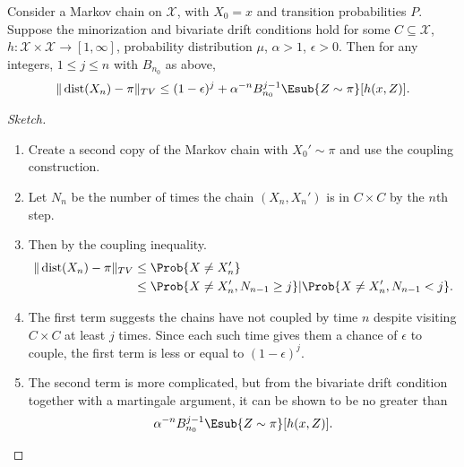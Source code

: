 \documentclass[12pt]{article}
\begin{document}
\begin{theorem}
    Consider a Markov chain on \( \mathcal{X} \), with \( X_0 = x \) and
    transition probabilities \( P \).  Suppose the minorization and
    bivariate drift conditions hold for some \( C \subseteq \mathcal{X} \),
    \( h :  \mathcal{X} \times \mathcal{X} \to [1, \infty] \),
    probability distribution \( \mu \), \( \alpha > 1 \), \( \epsilon >0
    \).  Then for any integers, \( 1 \le j \le n \) with \( B_{n_0} \)
    as above,
    \[
        \|
        \operatorname{dist}
        (X_n) - \pi \|_{TV} \le (1-\epsilon)^j + \alpha^{-n} B_{n_0}^{j-1}
        \Esub{Z \sim \pi}[h(x,Z)].
    \]

\end{theorem}

\begin{proof}[Sketch]
    \begin{enumerate}
        \item
            Create a second copy of the Markov chain with \( X_0' \sim
            \pi \) and use the coupling construction.
        \item
            Let \( N_n \) be the number of times the chain \( (X_n, X_n')
            \) is in \( C \times C \) by the \( n \)th step.
        \item
            Then by the coupling inequality.
            \begin{align*}
                \|
                \operatorname{dist}
                (X_n) - \pi \|_{TV} &\le \Prob{X \ne X_n'} \\
                &\le \Prob{X \ne X_n', N_{n-1} \ge j} | \Prob{X \ne X_n',
                N_{n-1} <j}.
            \end{align*}
        \item
            The first term suggests the chains have not coupled by time \(
            n \) despite visiting \( C \times C \) at least \( j \)
            times.  Since each such time gives them a chance of \(
            \epsilon \) to couple, the first term is less or equal to \(
            (1 - \epsilon)^j \).
        \item
            The second term is more complicated, but from the bivariate
            drift condition together with a martingale argument, it can
            be shown to be no greater than
            \[
                \alpha^{-n} B_{n_0}^{j-1} \Esub{Z \sim \pi}[h(x,Z)].
            \]
    \end{enumerate}
\end{proof}
\end{document}
